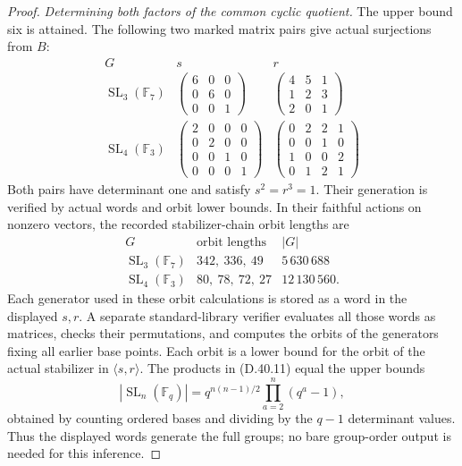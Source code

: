 \begin{proof}
\emph{Determining both factors of the common cyclic quotient.}
The upper bound six is attained. The following two
marked matrix pairs give actual surjections from $B$:
\[
 \begin{array}{c|c|c}
 G&s&r\\ \hline
 \operatorname{SL}_3(\mathbb F_7)&
 \begin{pmatrix}6&0&0\\0&6&0\\0&0&1\end{pmatrix}&
 \begin{pmatrix}4&5&1\\1&2&3\\2&0&1\end{pmatrix}\\[7pt]
 \operatorname{SL}_4(\mathbb F_3)&
 \begin{pmatrix}2&0&0&0\\0&2&0&0\\0&0&1&0\\0&0&0&1\end{pmatrix}&
 \begin{pmatrix}0&2&2&1\\0&0&1&0\\1&0&0&2\\0&1&2&1\end{pmatrix}
 \end{array}                                             \tag{D.40.10}
\]
Both pairs have determinant one and satisfy $s^2=r^3=1$.
Their generation is verified by actual words and orbit
lower bounds. In their faithful actions on nonzero
vectors, the recorded stabilizer-chain orbit lengths are
\[
 \begin{array}{c|c|r}
 G&\text{orbit lengths}&|G|\\ \hline
 \operatorname{SL}_3(\mathbb F_7)&342,\ 336,\ 49&5\,630\,688\\
 \operatorname{SL}_4(\mathbb F_3)&80,\ 78,\ 72,\ 27&12\,130\,560 .
 \end{array}                                             \tag{D.40.11}
\]
Each generator used in these orbit calculations is
stored as a word in the displayed $s,r$. A separate
standard-library verifier evaluates all those words
as matrices, checks their permutations, and computes
the orbits of the generators fixing all earlier base
points. Each orbit is a lower bound for the orbit
of the actual stabilizer in $\langle s,r\rangle$.
The products in (D.40.11) equal the upper bounds
\[
 |\operatorname{SL}_n(\mathbb F_q)|
   =q^{n(n-1)/2}\prod_{a=2}^n(q^a-1),
\]
obtained by counting ordered bases and dividing by
the $q-1$ determinant values. Thus the displayed
words generate the full groups; no bare group-order
output is needed for this inference.


\end{proof}
